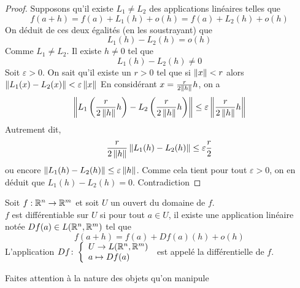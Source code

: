          \begin{proof}
             Supposons qu'il existe $L_1\neq L_2$ des applications linéaires telles que 
             \begin{equation*}
                 f(a+h)=f(a)+L_1(h)+o(h)=f(a)+L_2(h)+o(h)
             \end{equation*}
             On déduit de ces deux égalités (en les soustrayant) que
             \begin{equation*}
                 L_1(h)-L_2(h)=o(h)
             \end{equation*}
             Comme $L_1\neq L_2$. Il existe $h\neq 0$ tel que 
             \begin{equation*}
                 L_1(h)-L_2(h)\neq 0
             \end{equation*}
             Soit $\varepsilon>0$. On sait qu'il existe un $r>0$ tel que si $\left\| x \right\|<r$ alors $\left\| L_1(x)-L_2(x) \right\|<\varepsilon\left\| x \right\|$ En considérant $x= \frac{r}{2\left\| h \right\|}h$, on a
             \begin{equation*}
                 \left\| L_1\left(\frac{r}{2\left\| h \right\|}h\right)-L_2\left(\frac{r}{2\left\| h \right\|}h\right) \right\|\leq \varepsilon\left\| \frac{r}{2\left\| h \right\|}h \right\|
             \end{equation*}
             Autrement dit,
             \begin{equation*}
                 \frac{r}{2\left\| h \right\|}\left\| L_1(h)-L_2(h) \right\|\leq \varepsilon\frac{r}{2}
             \end{equation*}
             ou encore $\left\| L_1(h)-L_2(h) \right\|\leq \varepsilon\left\| h \right\|$. Comme cela tient pour tout $\varepsilon>0$, on en déduit que $L_1(h)-L_2(h)=0$. Contradiction
         \end{proof}
         \begin{definition}
             Soit $f:\mathbb{R}^n\to \mathbb{R}^m$ et soit $U$ un ouvert du domaine de $f$.\\
                 $f$ est différentiable sur $U$ si pour tout $a\in U$, il existe une application linéaire notée $Df(a)\in L(\mathbb{R}^n,\mathbb{R}^m)$ tel que 
                 \begin{equation*}
                     f(a+h)=f(a)+Df(a)(h)+o(h)
                 \end{equation*}
                 L'application $Df\colon \left\{\begin{array}{l}U\to L(\mathbb{R}^n,\mathbb{R}^m) \\a\mapsto Df(a) \end{array}\right.$ est appelé la différentielle de $f$.
         \end{definition} 
         \begin{remarque}
             Faites attention à la nature des objets qu'on manipule 
         \end{remarque}
